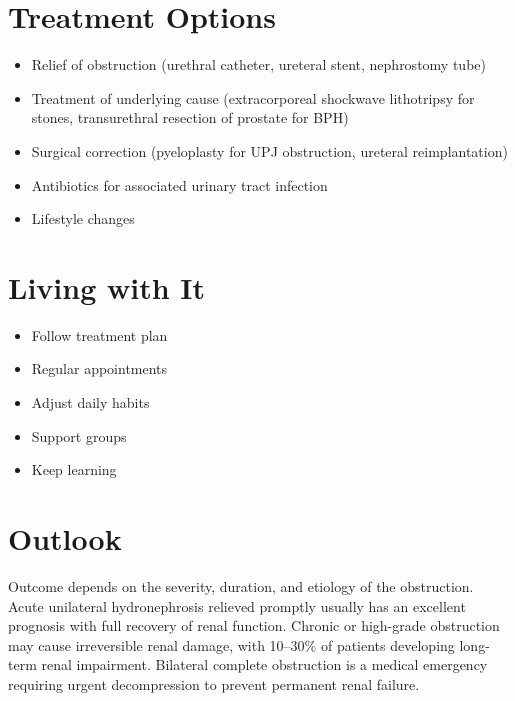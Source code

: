 \section{Treatment Options}
\begin{itemize}[noitemsep]
  \item Relief of obstruction (urethral catheter, ureteral stent, nephrostomy tube)
  \item Treatment of underlying cause (extracorporeal shockwave lithotripsy for stones, transurethral resection of prostate for BPH)
  \item Surgical correction (pyeloplasty for UPJ obstruction, ureteral reimplantation)
  \item Antibiotics for associated urinary tract infection
  \item Lifestyle changes
\end{itemize}

\section{Living with It}
\begin{itemize}[noitemsep]
  \item Follow treatment plan
  \item Regular appointments
  \item Adjust daily habits
  \item Support groups
  \item Keep learning
\end{itemize}

\section{Outlook}
Outcome depends on the severity, duration, and etiology of the obstruction. Acute unilateral hydronephrosis relieved promptly usually has an excellent prognosis with full recovery of renal function. Chronic or high-grade obstruction may cause irreversible renal damage, with 10--30\% of patients developing long-term renal impairment. Bilateral complete obstruction is a medical emergency requiring urgent decompression to prevent permanent renal failure.
